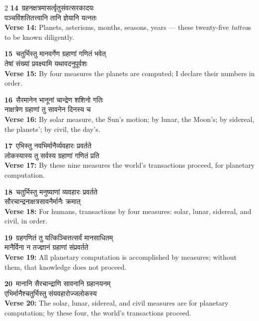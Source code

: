 \documentclass[11pt,a4paper]{article}
\newcommand{\dev}[1]{{\devanagarifont #1}}
\newcommand{\iast}[1]{\textit{#1}}
\newcommand{\vnum}[1]{\textcolor{versenumbercolor}{\textbf{#1}}}
\begin{document}
\begin{paracol}{2}
\switchcolumn[0]
\vnum{14}\ \dev{ग्रहनक्षत्रमासर्त्वृतुसंवत्सरकादयः}\\
\dev{पञ्चविंशतितत्त्वानि तानि ज्ञेयानि यत्नतः}\\
\switchcolumn[1]
\textbf{Verse 14:} Planets, asterisms, months, seasons, years --- these twenty-five \iast{tattva}s to be known diligently.

\switchcolumn[0]
\vnum{15}\ \dev{चतुर्भिस्तु मानवर्गेण ग्रहाणां गणितं भवेत्}\\
\dev{तेषां संख्यां प्रवक्ष्यामि यथावदनुपूर्वशः}\\
\switchcolumn[1]
\textbf{Verse 15:} By four measures the planets are computed; I declare their numbers in order.

\switchcolumn[0]
\vnum{16}\ \dev{सैरमानेन भानूनां चान्द्रेण शशिनो गतिः}\\
\dev{नाक्षत्रेण ग्रहाणां तु सावनेन दिनस्य च}\\
\switchcolumn[1]
\textbf{Verse 16:} By solar measure, the Sun's motion; by lunar, the Moon's; by sidereal, the planets'; by civil, the day's.

\switchcolumn[0]
\vnum{17}\ \dev{एभिस्तु नवभिर्मानैर्व्यवहारः प्रवर्तते}\\
\dev{लोकस्यास्य तु सर्वस्य ग्रहाणां गणितं प्रति}\\
\switchcolumn[1]
\textbf{Verse 17:} By these nine measures the world's transactions proceed, for planetary computation.

\switchcolumn[0]
\vnum{18}\ \dev{चतुर्भिस्तु मनुष्याणां व्यवहारः प्रवर्तते}\\
\dev{सौरचान्द्रनाक्षत्रसावनैर्मानैः क्रमात्}\\
\switchcolumn[1]
\textbf{Verse 18:} For humans, transactions by four measures: solar, lunar, sidereal, and civil, in order.

\switchcolumn[0]
\vnum{19}\ \dev{ग्रहगणितं तु यत्किञ्चित्तत्सर्वं मानसाधितम्}\\
\dev{मानैर्विना न तज्ज्ञानं ग्रहाणां संप्रवर्तते}\\
\switchcolumn[1]
\textbf{Verse 19:} All planetary computation is accomplished by measures; without them, that knowledge does not proceed.

\switchcolumn[0]
\vnum{20}\ \dev{मानानि सैरचान्द्राणि सावनानि ग्रहानयनम्}\\
\dev{एभिर्मानैश्चतुर्भिस्तु संयवहारोज्जलोकस्य}\\
\switchcolumn[1]
\textbf{Verse 20:} The solar, lunar, sidereal, and civil measures are for planetary computation; by these four, the world's transactions proceed.


\end{paracol}
\end{document}
